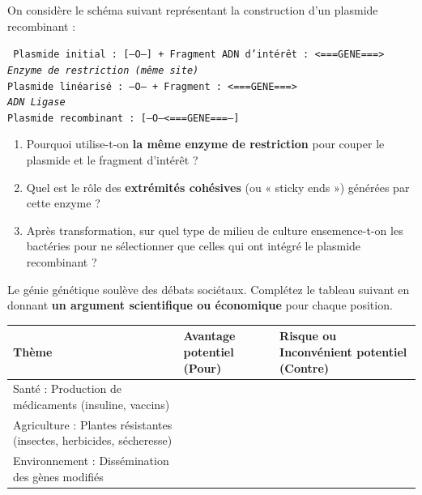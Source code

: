 \documentclass[11pt]{article}
\begin{document}
\begin{exercice}
On considère le schéma suivant représentant la construction d'un plasmide recombinant :
\begin{center}
\texttt{
Plasmide initial : [---O---] \quad + \quad Fragment ADN d'intérêt : <===GENE===>
\\
\downarrow \textit{Enzyme de restriction (même site)}
\\
Plasmide linéarisé : ---O--- \quad + \quad Fragment : <===GENE===>
\\
\downarrow \textit{ADN Ligase}
\\
Plasmide recombinant : [---O---<===GENE===---] }
\end{center}
\begin{enumerate}
    \item Pourquoi utilise-t-on \textbf{la même enzyme de restriction} pour couper le plasmide et le fragment d'intérêt ?
    \item Quel est le rôle des \textbf{extrémités cohésives} (ou « sticky ends ») générées par cette enzyme ?
    \item Après transformation, sur quel type de milieu de culture ensemence-t-on les bactéries pour ne sélectionner que celles qui ont intégré le plasmide recombinant ?
\end{enumerate}
\end{exercice}

\begin{exercice}
Le génie génétique soulève des débats sociétaux. Complétez le tableau suivant en donnant \textbf{un argument scientifique ou économique} pour chaque position.
\begin{center}
\begin{tabular}{|p{3.5cm}|p{5cm}|p{5cm}|}
\hline
\textbf{Thème} & \textbf{Avantage potentiel (Pour)} & \textbf{Risque ou Inconvénient potentiel (Contre)} \\ \hline
Santé : Production de médicaments (insuline, vaccins) & & \\ \hline
Agriculture : Plantes résistantes (insectes, herbicides, sécheresse) & & \\ \hline
Environnement : Dissémination des gènes modifiés & & \\ \hline
\end{tabular}
\end{center}
\end{exercice}
\end{document}

